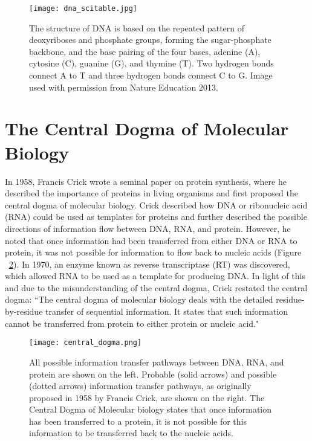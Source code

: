 \begin{figure}[!ht]
   \centering
   \texttt{[image: dna\_scitable.jpg]}
   \caption[DNA base pairing]{The structure of DNA is based on the repeated pattern of deoxyriboses and phosphate groups, forming the sugar-phosphate backbone, and the base pairing of the four bases, adenine (A), cytosine (C), guanine (G), and thymine (T). Two hydrogen bonds connect A to T and three hydrogen bonds connect C to G. Image used with permission from Nature Education 2013.}
   \label{fig:dna}
\end{figure}

\section{The Central Dogma of Molecular Biology}
\label{sec:central_dogma}

In 1958, Francis Crick wrote a seminal paper on protein synthesis, where he described the importance of proteins in living organisms and first proposed the central dogma of molecular biology\cite{crick1958protein}. Crick described how DNA or ribonucleic acid (RNA) could be used as templates for proteins and further described the possible directions of information flow between DNA, RNA, and protein. However, he noted that once information had been transferred from either DNA or RNA to protein, it was not possible for information to flow back to nucleic acids (Figure ~\ref{fig:central_dogma}). In 1970, an enzyme known as reverse transcriptase (RT) was discovered\cite{pmid4316301,pmid4316300}, which allowed RNA to be used as a template for producing DNA. In light of this and due to the misunderstanding of the central dogma, Crick restated the central dogma\cite{CRICK1970}: ``The central dogma of molecular biology deals with the detailed residue-by-residue transfer of sequential information. It states that such information cannot be transferred from protein to either protein or nucleic acid."

\begin{figure}[!ht]
   \centering
   \texttt{[image: central\_dogma.png]}
   \caption[The central dogma]{All possible information transfer pathways between DNA, RNA, and protein are shown on the left. Probable (solid arrows) and possible (dotted arrows) information transfer pathways, as originally proposed in 1958 by Francis Crick\cite{crick1958protein}, are shown on the right. The Central Dogma of Molecular biology states that once information has been transferred to a protein, it is not possible for this information to be transferred back to the nucleic acids.}
   \label{fig:central_dogma}
\end{figure}

